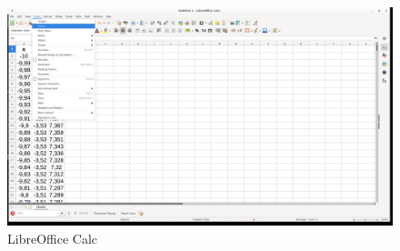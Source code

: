 \begin{figure}[h!]		
	\centering
   	\includegraphics[width=8.0in]{pictures/picture_014.png}
  	\caption{LibreOffice Calc}
   	\label{fig:LibreOfficeCalc014}
\end{figure}